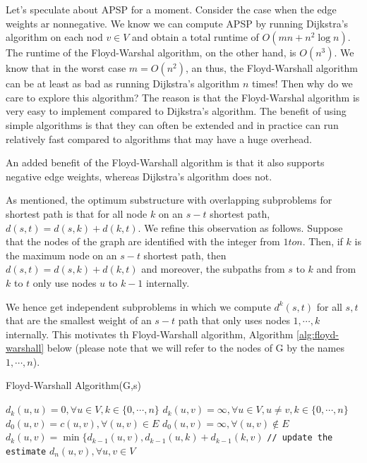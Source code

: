 \documentclass [12pt]{article}
\theoremstyle{definition}
\begin{document}
Let's speculate about APSP for a moment. Consider the case when the edge weights ar nonnegative. We know we can compute APSP by running Dijkstra's algorithm on each nod $v \in V$ and obtain a total runtime of $O(mn +  n^2 \log n)$. The runtime of the Floyd-Warshal algorithm, on the other hand, is $O(n^3)$. We know that in the worst case $m = O(n^2)$, an thus, the Floyd-Warshall algorithm can be at least as bad as running Dijkstra's algorithm  $n$ times! Then why do we care to explore this algorithm? The reason is that the Floyd-Warshal algorithm is very easy to implement compared to Dijkstra's algorithm. The benefit of using simple algorithms is that they can often be extended and in practice can run relatively fast compared to algorithms that may have a huge overhead.

An added benefit of the Floyd-Warshall algorithm is that it also supports negative edge weights, whereas Dijkstra's algorithm does not. 

As mentioned, the optimum substructure with overlapping subproblems for shortest path is that for all node $k$ on an $s-t$ shortest path, $d(s, t) = d(s, k) + d(k, t)$. We refine this observation as follows. Suppose that the nodes of the graph are identified with the integer from $1 to n$. Then, if $k$ is the maximum node on an $s-t$ shortest path, then $d(s, t) =  d(s, k) + d(k, t)$ and moreover, the subpaths from $s$ to $k$ and from $k$ to $t$ only use nodes $u$ to $k - 1$ internally.

We hence get independent subproblems in which we compute $d^{k}(s, t)$ for all $s, t$ that are the smallest weight of an $s-t$ path that only uses nodes $1, \cdots , k$ internally. This motivates th Floyd-Warshall algorithm, Algorithm \ref{alg:floyd-warshall} below (please note that we will refer to the nodes of G by the names $1, \cdots , n$).

\begin{algorithm}
\caption{Floyd-Warshall Algorithm(G,s)}
\label{alg:floyd-warshall}
\begin{algorithmic}
\STATE $d_k(u,u) = 0, \forall u \in V, k \in \{0, \cdots, n\}$
\STATE $d_k(u,v) = \infty, \forall u \in V, u\neq v, k \in \{0, \cdots, n\}$
\STATE $d_0(u,v) = c(u,v), \forall (u,v) \in E$
\STATE $d_0(u,v) = \infty, \forall (u,v) \notin E$
    \STATE $d_k(u,v) = \min\{ d_{k-1}(u,v), d_{k-1}(u,k) + d_{k-1}(k,v)$ \texttt{// update the estimate}
  \ENDFOR
\ENDFOR
\RETURN $d_n(u,v), \forall u,v \in V$
\end{algorithmic}
\end{algorithm}
\end{document}
